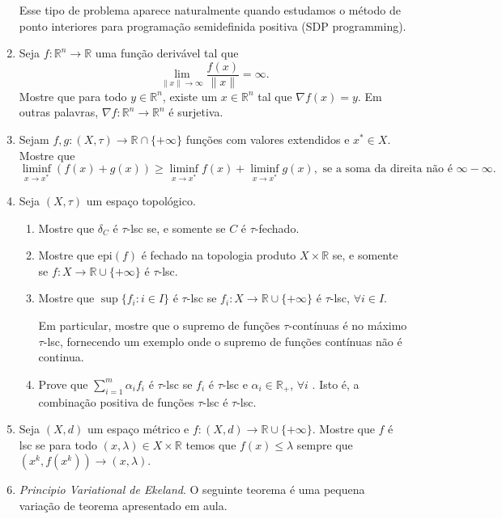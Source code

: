 \documentclass[a4paper,latin]{article}
\begin{document}
\begin{enumerate}
    Esse tipo de problema aparece naturalmente quando estudamos 
    o método de ponto interiores para programação semidefinida positiva (SDP programming).
        
    \item Seja $f:\mathbb{R}^{n}\rightarrow\mathbb{R}$ uma função derivável 
    tal que $$\lim_{\|x\|\rightarrow \infty} \frac{f(x)}{\|x\|}=\infty.$$
    Mostre que para todo $y \in \mathbb{R}^{n}$, existe um 
    $x \in \mathbb{R}^{n}$ tal que $\nabla f(x)=y$. Em outras palavras,
    $\nabla f: \mathbb{R}^{n}\rightarrow \mathbb{R}^{n}$ é surjetiva. 
    \item Sejam 
    $f,g:(X,\tau)\rightarrow \mathbb{R}\cap\{+\infty\}$ funções com valores extendidos e 
    $x^{*} \in X$. Mostre que
    $$ 
    \liminf_{x\rightarrow x^*}(f(x)+g(x))
    \geq 
    \liminf_{x\rightarrow x^*}f(x)
    +
    \liminf_{x\rightarrow x^*}g(x), 
    \text{ se a soma da direita não é } 
    \infty-\infty.$$     
     \item Seja $(X,\tau)$ um espaço topológico. 
      \begin{enumerate}
      \item  
      Mostre que $\delta_{C}$ é 
       $\tau$-lsc se, e somente se $C$ é $\tau$-fechado.
      \item Mostre que $\text{epi}(f)$
      é fechado na topologia produto $X \times \mathbb{R}$ se, e somente se 
      $f: X \rightarrow \mathbb{R}\cup\{+\infty\}$ é $\tau$-lsc.
      \item Mostre que 
      $\sup \{f_{i}:i \in I\}$
      é $\tau$-lsc se 
      $f_i: X \rightarrow \mathbb{R}\cup\{+\infty\}$ é $\tau$-lsc, 
      $\forall i \in I$.
      
      Em particular, mostre que o supremo de funções $\tau$-contínuas 
      é no máximo $\tau$-lsc, fornecendo um exemplo onde o 
      supremo de funções contínuas não é continua.      
      \item 
    Prove que $\sum_{i=1}^{m} \alpha_{i}f_{i}$
    é $\tau$-lsc se $f_{i}$ é $\tau$-lsc  
    e $\alpha_{i} \in \mathbb{R}_{+}$, $\forall i$ . Isto é, a combinação positiva de funções $\tau$-lsc é $\tau$-lsc.
      \end{enumerate}
    \item Seja $(X,d)$ um espaço métrico e $f:(X,d) \rightarrow 
    \mathbb{R}\cup \{+\infty\}$. Mostre que $f$ é lsc se para todo $(x,\lambda) \in X \times \mathbb{R}$
     temos que $f(x)\leq \lambda$ sempre que 
     $(x^{k},f(x^k))\rightarrow (x,\lambda)$.
    \item {\it Principio Variational de Ekeland}. 
    O seguinte teorema é uma pequena variação de 
    teorema apresentado em aula.
    

\end{enumerate}
\end{document}
